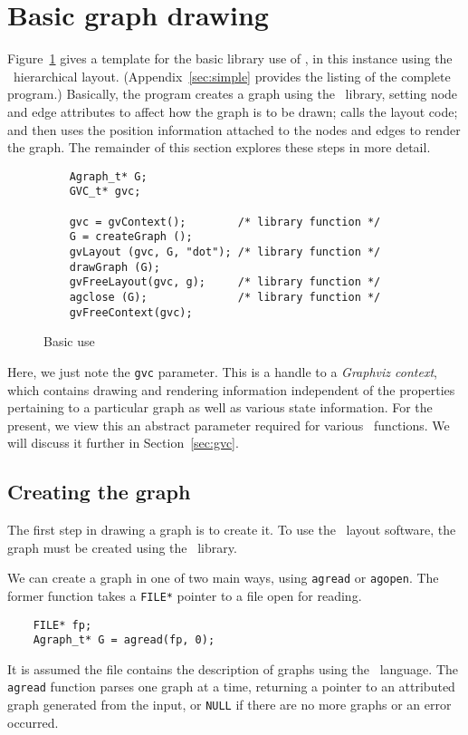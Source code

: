 \section{Basic graph drawing}
Figure~\ref{fig:basic} gives a template for the basic library use of \gviz,
in this instance using the \dot\ hierarchical layout.
(Appendix~\ref{sec:simple} provides the listing of the complete program.)
Basically, the program creates a graph using the \graph\
library, setting node and edge 
attributes to affect how the graph is
to be drawn; calls the layout code; and then uses the position information
attached to the nodes and edges to render the graph. The remainder of
this section explores these steps in more detail.

\begin{figure}[hbt]
\begin{verbatim}
    Agraph_t* G;
    GVC_t* gvc;

    gvc = gvContext();        /* library function */
    G = createGraph ();
    gvLayout (gvc, G, "dot"); /* library function */
    drawGraph (G);
    gvFreeLayout(gvc, g);     /* library function */ 
    agclose (G);              /* library function */
    gvFreeContext(gvc);
\end{verbatim}
\caption{Basic use}
\label{fig:basic}
\end{figure}

Here, we just note the {\tt gvc} parameter. This is a handle
to a {\em Graphviz context}, which contains drawing and rendering
information independent of the properties pertaining to a particular
graph as well as various state information. 
For the present, we view this an abstract parameter required
for various \gviz\ functions. We will discuss it further in  
Section~\ref{sec:gvc}.

\subsection{Creating the graph}
The first step in drawing a graph is to create it. To use the \gviz\
layout software, the graph must be created using the \graph\ library. 

We can create a graph in one of two main ways, using {\tt agread} or {\tt agopen}.
The former function takes a {\tt FILE*} pointer to a file open for reading.
\begin{verbatim}
    FILE* fp;
    Agraph_t* G = agread(fp, 0);
\end{verbatim}
It is assumed the file contains the description of graphs using the
\DOT\ language. The {\tt agread} function parses one graph at a time, 
returning a pointer to an attributed graph generated from the input,
or {\tt NULL} if there are no more graphs or an error occurred.

